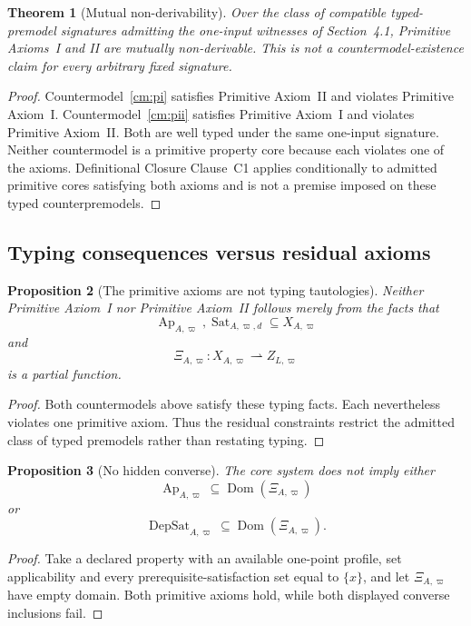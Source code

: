 \documentclass[11pt]{article}
\newcommand{\Ap}{\operatorname{Ap}}
\newcommand{\DepSat}{\operatorname{DepSat}}
\newcommand{\Sat}{\operatorname{Sat}}
\newcommand{\Dom}{\operatorname{Dom}}
\newtheorem{theorem}{Theorem}[section]
\newtheorem{proposition}[theorem]{Proposition}
\theoremstyle{definition}
\theoremstyle{remark}
\begin{document}
\begin{theorem}[Mutual non-derivability]
\label{thm:independence}
Over the class of compatible typed-premodel signatures admitting the one-input witnesses of Section~4.1, Primitive Axioms~I and II are mutually non-derivable. This is not a countermodel-existence claim for every arbitrary fixed signature.
\end{theorem}

\begin{proof}
Countermodel~\ref{cm:pi} satisfies Primitive Axiom~II and violates Primitive Axiom~I.
Countermodel~\ref{cm:pii} satisfies Primitive Axiom~I and violates Primitive Axiom~II.
Both are well typed under the same one-input signature.
Neither countermodel is a primitive property core because each violates one of the axioms.
Definitional Closure Clause~C1 applies conditionally to admitted primitive cores satisfying both axioms and is not a premise imposed on these typed counterpremodels.
\end{proof}

\subsection{Typing consequences versus residual axioms}

\begin{proposition}[The primitive axioms are not typing tautologies]
Neither Primitive Axiom~I nor Primitive Axiom~II follows merely from the facts that
\[
\Ap_{A,\varpi},\Sat_{A,\varpi,d}\subseteq X_{A,\varpi}
\]
and
\[
\Xi_{A,\varpi}:X_{A,\varpi}\rightharpoonup Z_{L,\varpi}
\]
is a partial function.
\end{proposition}

\begin{proof}
Both countermodels above satisfy these typing facts.
Each nevertheless violates one primitive axiom.
Thus the residual constraints restrict the admitted class of typed premodels rather than restating typing.
\end{proof}

\begin{proposition}[No hidden converse]
The core system does not imply either
\[
\Ap_{A,\varpi}\subseteq\Dom(\Xi_{A,\varpi})
\]
or
\[
\DepSat_{A,\varpi}\subseteq\Dom(\Xi_{A,\varpi}).
\]
\end{proposition}

\begin{proof}
Take a declared property with an available one-point profile, set applicability and every prerequisite-satisfaction set equal to \(\{x\}\), and let \(\Xi_{A,\varpi}\) have empty domain.
Both primitive axioms hold, while both displayed converse inclusions fail.
\end{proof}
\end{document}
